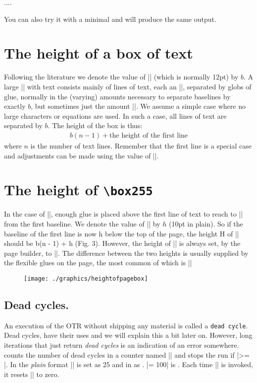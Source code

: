 \begin{teXXX}
....
\showthe\pagedepth
\bye
\end{teXXX}

You can also try it with a \latex minimal and will produce the same output.


\section{The height of a box of text}

Following the literature we denote the value of |\baselineskip| (which is normally 12pt) by $b$. 
A
large |\vbox| with text consists mainly of lines of
text, each an |\hbox|, separated by globs of glue,
normally in the (varying) amounts necessary to
separate baselines by exactly $b$, but sometimes just
the amount |\lineskip|. We assume a simple case
where no large characters or equations are used. In
such a case, all lines of text are separated by $b$. The
height of the box is thus:
\begin{gather}
b(n - 1) + \text{the height of the first line}
\end{gather}
where $n$ is the number of text lines. Remember that the first line is a special case and adjustments can be made using the value of |\topskip|.

\section{The height of \texttt{\textbackslash box255}}

In the case of ||,
enough glue is placed above the first line of text
to reach to |\topskip| from the first baseline. We
denote the value of |\topskip| by $h$ (10pt in plain).
So if the baseline of the first line is now h below the
top of the page, the height H of || should
be b(n - 1) + h (Fig. 3). However, the height of
|| is always set, by the page builder, to
|\vsize|. The difference between the two heights is
usually supplied by the flexible glues on the page,
the most common of which is |\parskip|

\begin{figure}[htp]
\texttt{[image: ./graphics/heightofpagebox]}
\end{figure}


\subsection{Dead cycles.} An execution of the OTR without shipping any material is called a \texttt{dead cycle}. Dead cycles, have their uses and we will explain this a bit later on. However, long iterations that just return \textit{dead cycles} is an indication of an error somewhere. \tex counts the number of dead cycles in a counter named |\deadcycles| and stops the run if |\deadcycles >= \maxdeadcycles|.  In the \textit{plain} format |\maxdeadcycles| is set as 25 and in \latex as \the\deadcycles. |\maxdeadcycles = 100| is \the\maxdeadcycles. Each time |\shipout| is invoked, it resets |\deadcycles| to zero.


